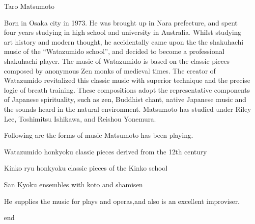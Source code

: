 ﻿Taro Matsumoto

Born in Osaka city in 1973.
He was brought up in Nara prefecture, and spent four years studying in high school and university in Australia.
Whilst studying art history and modern thought, he accidentally came upon the the shakuhachi music of the “Watazumido school”, and decided to become a professional shakuhachi player. The music of Watazumido is based on the classic pieces composed by anonymous Zen monks of medieval times. The creator of Watazumido revitalized this classic music with superior technique and the precise logic of breath training. These compositions adopt the representative components of  Japanese spirituality, such as zen, Buddhist chant, native Japanese music and the sounds heard in the natural environment. Matsumoto has studied under Riley Lee, Toshimitsu Ishikawa, and Reishou Yonemura. 

Following are the forms of music Matsumoto has been playing. 

Watazumido honkyoku   classic pieces derived from the 12th century

Kinko ryu honkyoku      classic pieces of the Kinko school

San Kyoku               ensembles with koto and shamisen

He supplies the music for plays and operas,and also is an excellent improviser.


                                         end        
